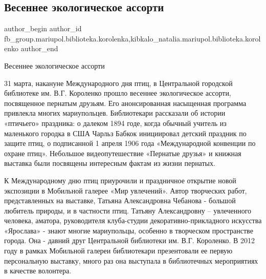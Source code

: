 
 
 
 
 

\subsection{Весеннее экологическое ассорти}
\label{sec:01_04_2018.fb.fb_group.mariupol.biblioteka.korolenka.1.vesennee_ekologiches}
 
\ifcmt
 author_begin
   author_id fb_group.mariupol.biblioteka.korolenka,kibkalo_natalia.mariupol.biblioteka.korolenko
 author_end
\fi

Весеннее экологическое ассорти

31 марта, накануне Международного  дня птиц, в Центральной городской библиотеке
им. В.Г. Короленко прошло весеннее экологическое ассорти, посвященное пернатым
друзьям. Его анонсированная насыщенная программа привлекла многих мариупольцев.
Библиотекари рассказали об истории «птичьего» праздника: о далеком 1894 годе,
когда обычный учитель из маленького городка в США Чарльз Бабкок инициировал
детский праздник по защите птиц, о подписанной 1 апреля 1906 года
«Международной конвенции по охране птиц». Небольшое видеопутешествие «Пернатые
друзья» и книжная выставка были посвящены интересным фактам из жизни пернатых.

К Международному дню птиц приурочили и праздничное открытие новой экспозиции в
Мобильной галерее  «Мир увлечений». Автор творческих работ, представленных  на
выставке, Татьяна Александровна Чебанова -  большой любитель природы, и в
частности птиц. Татьяну Александровну – увлеченного человека, аматора,
руководителя  клуба-студии декоративно-прикладного искусства «Ярослава» - знают
многие мариупольцы, особенно в творческом пространстве города. Она - давний
друг Центральной библиотеки им. В.Г. Короленко. В 2012 году в рамках Мобильной
галереи библиотекари презентовали ее первую персональную выставку, много раз
она выступала в библиотечных мероприятиях в качестве волонтера. 

